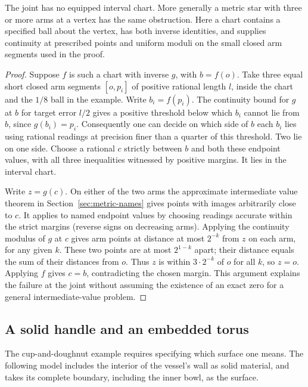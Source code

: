 \begin{proposition}\label{idx-ribbon23}
The joint has no equipped interval chart. More generally a metric star with three or more arms at a vertex has the same obstruction. Here a chart contains a specified ball about the vertex, has both inverse identities, and supplies continuity at prescribed points and uniform moduli on the small closed arm segments used in the proof.
\end{proposition}
\begin{proof}
Suppose $f$ is such a chart with inverse $g$, with $b=f(o)$. Take three equal short closed arm segments $[o,p_i]$ of positive rational length $l$, inside the chart and the $1/8$ ball in the example. Write $b_i=f(p_i)$. The continuity bound for $g$ at $b$ for target error $l/2$ gives a positive threshold below which $b_i$ cannot lie from $b$, since $g(b_i)=p_i$. Consequently one can decide on which side of $b$ each $b_i$ lies using rational readings at precision finer than a quarter of this threshold. Two lie on one side. Choose a rational $c$ strictly between $b$ and both these endpoint values, with all three inequalities witnessed by positive margins. It lies in the interval chart.

Write $z=g(c)$. On either of the two arms the approximate intermediate value theorem in Section~\ref{sec:metric-names} gives points with images arbitrarily close to $c$. It applies to named endpoint values by choosing readings accurate within the strict margins (reverse signs on decreasing arms). Applying the continuity modulus of $g$ at $c$ gives arm points at distance at most $2^{-k}$ from $z$ on each arm, for any given $k$. These two points are at most $2^{1-k}$ apart; their distance equals the sum of their distances from $o$. Thus $z$ is within $3\cdot2^{-k}$ of $o$ for all $k$, so $z=o$. Applying $f$ gives $c=b$, contradicting the chosen margin. This argument explains the failure at the joint without assuming the existence of an exact zero for a general intermediate-value problem.
\end{proof}

\subsection{A solid handle and an embedded torus}
The cup-and-doughnut example requires specifying which surface one means. The following model includes the interior of the vessel's wall as solid material, and takes its complete boundary, including the inner bowl, as the surface.

